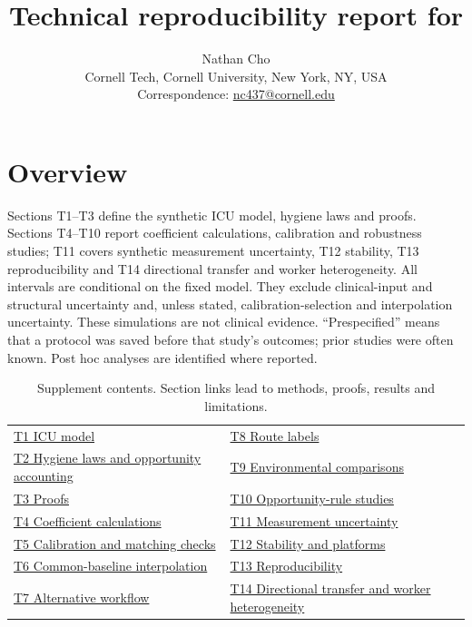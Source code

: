 \documentclass[11pt]{article}
\title{Technical reproducibility report for\\ \papertitle}
\author{Nathan Cho\\[.3em]
\small Cornell Tech, Cornell University, New York, NY, USA\\
\small Correspondence: \href{mailto:nc437@cornell.edu}{nc437@cornell.edu}}
\date{}
\begin{document}
\maketitle

\section*{Overview}
Sections T1--T3 define the synthetic ICU model, hygiene laws and proofs.
Sections T4--T10 report coefficient calculations, calibration and robustness
studies; T11 covers synthetic measurement uncertainty, T12 stability, T13
reproducibility and T14 directional transfer and worker heterogeneity.
All intervals are conditional on the fixed model. They exclude clinical-input
and structural uncertainty and, unless stated, calibration-selection and
interpolation uncertainty. These simulations are not clinical evidence.
``Prespecified'' means that a protocol was saved before that study's outcomes;
prior studies were often known. Post hoc analyses are identified where reported.

\begin{table}[htbp]\centering\small
\caption{Supplement contents. Section links lead to methods, proofs, results and limitations.}\label{tab:flow}
\begin{tabular}{@{}p{.48\linewidth}p{.48\linewidth}@{}}\toprule
\hyperref[sec:s-model]{T1 ICU model} & \hyperref[sec:s-routes]{T8 Route labels}\\
\hyperref[sec:s-hygiene]{T2 Hygiene laws and opportunity accounting} & \hyperref[sec:s-environment]{T9 Environmental comparisons}\\
\hyperref[sec:s-proofs]{T3 Proofs} & \hyperref[sec:s-clock]{T10 Opportunity-rule studies}\\
\hyperref[sec:s-coefficient]{T4 Coefficient calculations} & \hyperref[sec:s-uq]{T11 Measurement uncertainty}\\
\hyperref[sec:s-calibration]{T5 Calibration and matching checks} & \hyperref[sec:s-stability]{T12 Stability and platforms}\\
\hyperref[sec:s-common]{T6 Common-baseline interpolation} & \hyperref[sec:s-repro]{T13 Reproducibility}\\
\hyperref[sec:s-alternative]{T7 Alternative workflow} & \hyperref[sec:s-directional]{T14 Directional transfer and worker heterogeneity}\\
\bottomrule\end{tabular}
\end{table}
\clearpage
\end{document}
